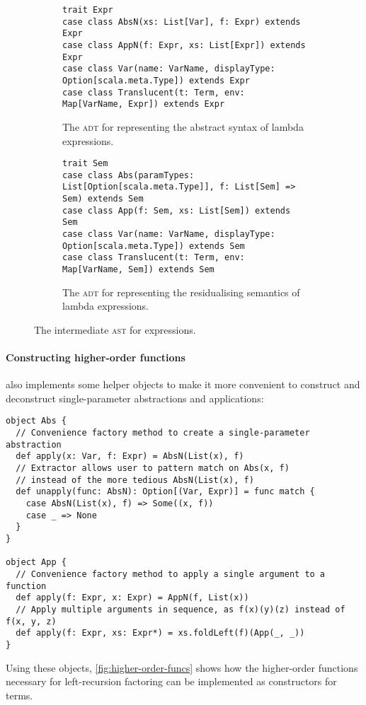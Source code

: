 \documentclass[../../../main.tex]{subfiles}
\begin{document}
\begin{figure}[htb]
\begin{subfigure}{\textwidth}
\begin{verbatim}
trait Expr
case class AbsN(xs: List[Var], f: Expr) extends Expr
case class AppN(f: Expr, xs: List[Expr]) extends Expr
case class Var(name: VarName, displayType: Option[scala.meta.Type]) extends Expr
case class Translucent(t: Term, env: Map[VarName, Expr]) extends Expr
\end{verbatim}
\caption{The  \textsc{adt} for representing the abstract syntax of lambda expressions.}
\label{fig:expr-adt}
\end{subfigure}
%
\begin{subfigure}{\textwidth}
\vspace{3ex}
\begin{verbatim}
trait Sem
case class Abs(paramTypes: List[Option[scala.meta.Type]], f: List[Sem] => Sem) extends Sem
case class App(f: Sem, xs: List[Sem]) extends Sem
case class Var(name: VarName, displayType: Option[scala.meta.Type]) extends Sem
case class Translucent(t: Term, env: Map[VarName, Sem]) extends Sem
\end{verbatim}
\caption{The  \textsc{adt} for representing the residualising semantics of lambda expressions.}
\label{fig:sem-adt}
\end{subfigure}
\caption{The intermediate \textsc{ast} for expressions.}
\end{figure}

\paragraph{Constructing higher-order functions}
 also implements some helper objects to make it more convenient to construct and deconstruct single-parameter abstractions and applications:
\begin{verbatim}
object Abs {
  // Convenience factory method to create a single-parameter abstraction
  def apply(x: Var, f: Expr) = AbsN(List(x), f)
  // Extractor allows user to pattern match on Abs(x, f)
  // instead of the more tedious AbsN(List(x), f)
  def unapply(func: AbsN): Option[(Var, Expr)] = func match {
    case AbsN(List(x), f) => Some((x, f))
    case _ => None
  }
}

object App {
  // Convenience factory method to apply a single argument to a function
  def apply(f: Expr, x: Expr) = AppN(f, List(x))
  // Apply multiple arguments in sequence, as f(x)(y)(z) instead of f(x, y, z)
  def apply(f: Expr, xs: Expr*) = xs.foldLeft(f)(App(_, _))
}
\end{verbatim}
%
Using these objects, \cref{fig:higher-order-funcs} shows how the higher-order functions necessary for left-recursion factoring can be implemented as constructors for  terms.
\end{document}
